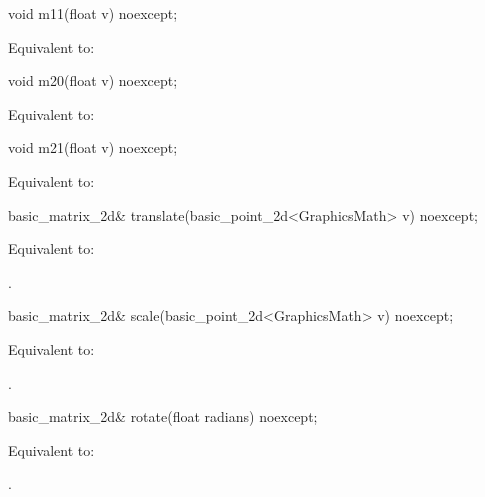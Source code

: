 %
\begin{itemdecl}
void m11(float v) noexcept;
\end{itemdecl}
\begin{itemdescr}
\pnum
\effects
Equivalent to: 
\end{itemdescr}

%
\begin{itemdecl}
void m20(float v) noexcept;
\end{itemdecl}
\begin{itemdescr}
\pnum
\effects
Equivalent to: 
\end{itemdescr}

%
\begin{itemdecl}
void m21(float v) noexcept;
\end{itemdecl}
\begin{itemdescr}
\pnum
\effects
Equivalent to: 
\end{itemdescr}

%
\begin{itemdecl}
basic_matrix_2d& translate(basic_point_2d<GraphicsMath> v) noexcept;
\end{itemdecl}
\begin{itemdescr}
\pnum
\effects
Equivalent to: 

\pnum
\returns
{}.
\end{itemdescr}

%
\begin{itemdecl}
basic_matrix_2d& scale(basic_point_2d<GraphicsMath> v) noexcept;
\end{itemdecl}
\begin{itemdescr}
\pnum
\effects
Equivalent to: 

\pnum
\returns
{}.
\end{itemdescr}

%
\begin{itemdecl}
basic_matrix_2d& rotate(float radians) noexcept;
\end{itemdecl}
\begin{itemdescr}
\pnum
\effects
Equivalent to: 

\pnum
\returns
{}.
\end{itemdescr}

